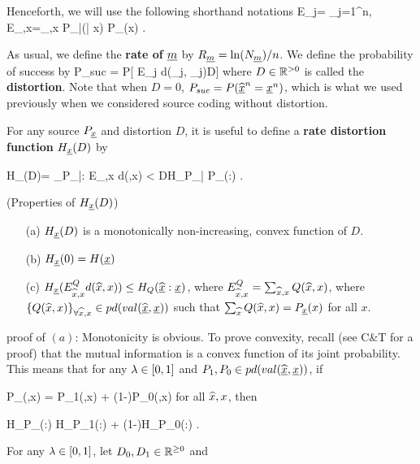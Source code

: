 Henceforth, we will use
the following shorthand notations
\beq
E_j= \sum_{j=1}^n\;,
\;\;
E_{,x}=\sum_{,x} P_{\what{\rvx}|\rvx}(| x)
P_\rvx(x)
\;.
\eeq

As usual, we define the  {\bf rate of} $\rvm$
by $R_\rvm = \ln(N_\rvm)/n$.
We define the probability of success by
\beq
P_{suc} = P[
E_j d(\what{\rvx}_j, \rvx_j)\leq D]
\;
\label{sit-eq-def-of-d}
\eeq
where $D\in{ \mathbb{R}}^{>0}$ is called
the {\bf distortion}.
Note that when $D=0$,
$P_{suc}= P(\what{\rvx}^n=\rvx^n)$,
which is what we used
previously when we considered
source coding
without distortion.

For any source $P_\rvx$ and distortion $D$,
it is useful to define a
{\bf rate distortion function}
$H_\rvx(D)$ by

\beq
H_\rvx(D)=
\min_{P_{\what{\rvx}|\rvx}:
E_{,x} d(,x)
< D}H_{P_{\what{\rvx}|\rvx}
P_\rvx}(\what{\rvx}:\rvx)
\;.
\eeq

\begin{claim}\label{cl-props-rat-dis}
(Properties of $H_\rvx(D)$)

\begin{itemize}
\item[(a)]
$H_\rvx(D)$ is a monotonically non-increasing,
convex
function of $D$.
\item[(b)]
$H_\rvx(0) = H(\rvx)$
\item[(c)]
$H_\rvx(E^{Q}_{\what{x},x}d(\what{x},x))
\leq H_{Q}(\what{\rvx}:\rvx)$,
where $E^{Q}_{{\widehat{x}},x}=\sum_{{\widehat{x}},x}
Q({\widehat{x}},x)$,
where $\{Q(\what{x},x)\}_{\forall \what{x},x}
\in pd(val(\what{\rvx},\rvx))$
such that
$\sum_{\what{x}}Q(\what{x},x)=P_\rvx(x)$
for all $x$.

\end{itemize}
\end{claim}
\proof

proof of $(a)$: Monotonicity is obvious.
To prove convexity, recall
(see C\&T for a proof) that
the mutual information is a convex
function of its joint probability.
This means that
for any $\lambda\in [0,1]$
and
$P_1, P_0\in pd(val(\what{\rvx},\rvx))$,
if

\beq
P_\lam(,x) =
\lam P_1(,x) +
(1-\lam)P_0(,x)
\;
\label{sit-eq-p-lam-def}
\eeq
for all ${\widehat{x}},x$,
then

\beq
H_{P_\lam}(\what{\rvx}:\rvx) \leq
\lam H_{P_1}(\what{\rvx}:\rvx) +
(1-\lam)H_{P_0}(\what{\rvx}:\rvx)
\;.
\eeq

For any
$\lambda \in [0,1]$,
let
$D_0, D_1\in { \mathbb{R}}^{\geq 0}$
and

